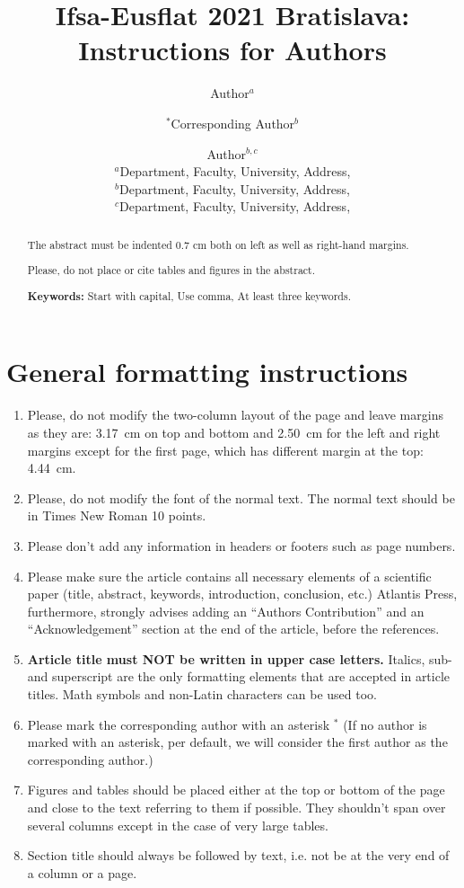 \documentclass{eusflat2021}
\title{\bf Ifsa-Eusflat 2021 Bratislava: Instructions for Authors}
\author{Author$^a$ \and $^*$Corresponding Author$^b$ \and Author$^{b,c}$\\
$^a$Department, Faculty, University, Address, \email{account@domain.com} \\
$^b$Department, Faculty, University, Address, \email{account@domain.com} \\
$^c$Department, Faculty, University, Address, \email{account@domain.com}}
\begin{document}
\maketitle

\begin{abstract}
The abstract must be indented 0.7 cm both on left as well as right-hand margins.

Please, do not place or cite tables and figures in the abstract.

{\bf Keywords:} Start with capital, Use comma, At least three keywords.
\end{abstract}

\section{General formatting instructions}

\begin{enumerate}
    \item Please, do not modify the two-column layout of the page and leave margins as they are: 3.17~cm on top and bottom and 2.50~cm for the left and right margins except for the first page, which has different margin at the top: 4.44~cm.
    
    \item Please, do not modify the font of the normal text. The normal text should be in Times New Roman 10 points.

    \item Please don’t add any information in headers or footers such as page numbers.

    \item Please make sure the article contains all necessary elements of a scientific paper (title, abstract, keywords, introduction, conclusion, etc.) Atlantis Press, furthermore, strongly advises adding an “Authors Contribution” and an “Acknowledgement” section at the end of the article, before the references.

    \item {\bf Article title must NOT be written in upper case letters.} Italics, sub- and superscript are the only formatting elements that are accepted in article titles. Math symbols and non-Latin characters can be used too.
    
    \item Please mark the corresponding author with an asterisk $^*$ (If no author is marked with an asterisk, per default, we will consider the first author as the corresponding author.)

    \item Figures and tables should be placed either at the top or bottom of the page and close to the text referring to them if possible. They shouldn’t span over several columns except in the case of very large tables.

    \item Section title should always be followed by text, i.e. not be at the very end of a column or a page.
\end{enumerate}
\end{document}
